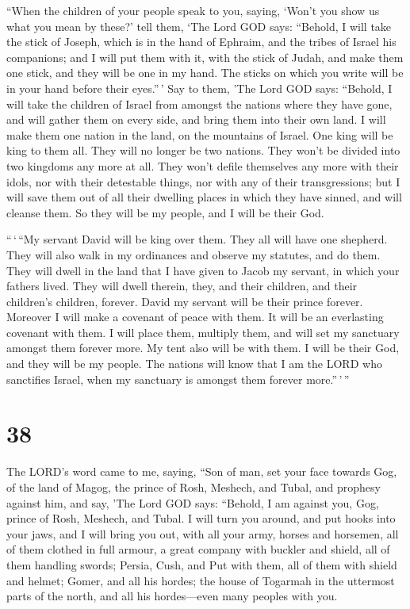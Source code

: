 ``When the children of your people speak to you, saying,
`Won't you show us what you mean by these?'  tell them,
`The Lord GOD says: ``Behold, I will take the stick of Joseph, which is
in the hand of Ephraim, and the tribes of Israel his companions; and I
will put them with it, with the stick of Judah, and make them one stick,
and they will be one in my hand.  The sticks on which you
write will be in your hand before their eyes.''\,'  Say to
them, 'The Lord GOD says: ``Behold, I will take the children of Israel
from amongst the nations where they have gone, and will gather them on
every side, and bring them into their own land.  I will
make them one nation in the land, on the mountains of Israel. One king
will be king to them all. They will no longer be two nations. They won't
be divided into two kingdoms any more at all.  They won't
defile themselves any more with their idols, nor with their detestable
things, nor with any of their transgressions; but I will save them out
of all their dwelling places in which they have sinned, and will cleanse
them. So they will be my people, and I will be their God.

 ``\,`\,``My servant David will be king over them. They all
will have one shepherd. They will also walk in my ordinances and observe
my statutes, and do them.  They will dwell in the land that
I have given to Jacob my servant, in which your fathers lived. They will
dwell therein, they, and their children, and their children's children,
forever. David my servant will be their prince forever. 
Moreover I will make a covenant of peace with them. It will be an
everlasting covenant with them. I will place them, multiply them, and
will set my sanctuary amongst them forever more.  My tent
also will be with them. I will be their God, and they will be my people.
 The nations will know that I am the LORD who sanctifies
Israel, when my sanctuary is amongst them forever more.''\,'\,''

\hypertarget{section-36}{%
\section{38}\label{section-36}}

 The LORD's word came to me, saying,  ``Son of
man, set your face towards Gog, of the land of Magog, the prince of
Rosh, Meshech, and Tubal, and prophesy against him,  and
say, 'The Lord GOD says: ``Behold, I am against you, Gog, prince of
Rosh, Meshech, and Tubal.  I will turn you around, and put
hooks into your jaws, and I will bring you out, with all your army,
horses and horsemen, all of them clothed in full armour, a great company
with buckler and shield, all of them handling swords; 
Persia, Cush, and Put with them, all of them with shield and helmet;
 Gomer, and all his hordes; the house of Togarmah in the
uttermost parts of the north, and all his hordes---even many peoples
with you.

